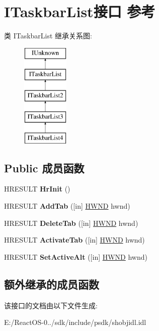 \hypertarget{interface_i_taskbar_list}{}\section{I\+Taskbar\+List接口 参考}
\label{interface_i_taskbar_list}
类 I\+Taskbar\+List 继承关系图\+:\begin{figure}[H]
\begin{center}
\leavevmode
\includegraphics[height=5.000000cm]{interface_i_taskbar_list}
\end{center}
\end{figure}
\subsection*{Public 成员函数}
\begin{DoxyCompactItemize}
\item 
\mbox{\label{interface_i_taskbar_list_a6503104547dc9426576c72cb0259750b}} 
H\+R\+E\+S\+U\+LT {\bfseries Hr\+Init} ()
\item 
\mbox{\label{interface_i_taskbar_list_a5d39012a8d979ce629347dcf9e083443}} 
H\+R\+E\+S\+U\+LT {\bfseries Add\+Tab} (\mbox{[}in\mbox{]} \hyperlink{interfacevoid}{H\+W\+ND} hwnd)
\item 
\mbox{\label{interface_i_taskbar_list_a78aa1ba74e55b4908bfe3babf5fff2e1}} 
H\+R\+E\+S\+U\+LT {\bfseries Delete\+Tab} (\mbox{[}in\mbox{]} \hyperlink{interfacevoid}{H\+W\+ND} hwnd)
\item 
\mbox{\label{interface_i_taskbar_list_a2dd42337920693d9641a3dbc34aa1893}} 
H\+R\+E\+S\+U\+LT {\bfseries Activate\+Tab} (\mbox{[}in\mbox{]} \hyperlink{interfacevoid}{H\+W\+ND} hwnd)
\item 
\mbox{\label{interface_i_taskbar_list_ab33065e86e0538d3814654500563c2f7}} 
H\+R\+E\+S\+U\+LT {\bfseries Set\+Active\+Alt} (\mbox{[}in\mbox{]} \hyperlink{interfacevoid}{H\+W\+ND} hwnd)
\end{DoxyCompactItemize}
\subsection*{额外继承的成员函数}


该接口的文档由以下文件生成\+:\begin{DoxyCompactItemize}
\item 
E\+:/\+React\+O\+S-\/0../sdk/include/psdk/shobjidl.\+idl\end{DoxyCompactItemize}
